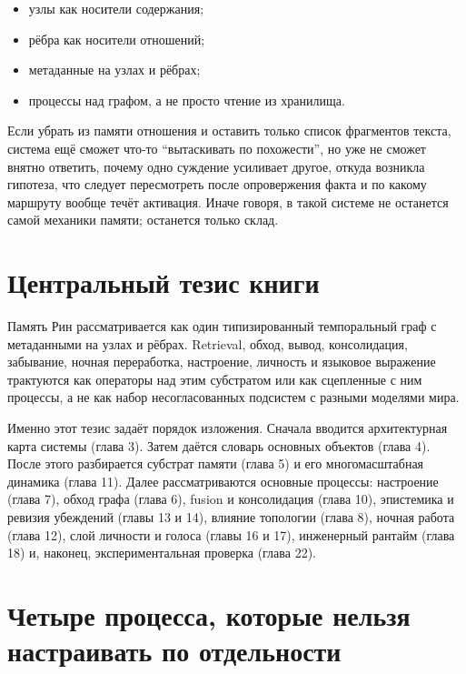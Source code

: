 \begin{itemize}
\item узлы как носители содержания;
\item рёбра как носители отношений;
\item метаданные на узлах и рёбрах;
\item процессы над графом, а не просто чтение из хранилища.
\end{itemize}

\begin{intuition}
Если убрать из памяти отношения и оставить только список фрагментов текста,
система ещё сможет что-то ``вытаскивать по похожести'', но уже не сможет внятно
ответить, почему одно суждение усиливает другое, откуда возникла гипотеза, что
следует пересмотреть после опровержения факта и по какому маршруту вообще
течёт активация. Иначе говоря, в такой системе не останется самой механики
памяти; останется только склад.
\end{intuition}

\section{Центральный тезис книги}

\begin{principle}
Память Рин рассматривается как один типизированный темпоральный граф с
метаданными на узлах и рёбрах. Retrieval, обход, вывод, консолидация,
забывание, ночная переработка, настроение, личность и языковое выражение
трактуются как операторы над этим субстратом или как сцепленные с ним
процессы, а не как набор несогласованных подсистем с разными моделями мира.
\end{principle}

Именно этот тезис задаёт порядок изложения. Сначала вводится архитектурная
карта системы (глава 3). Затем даётся словарь основных объектов (глава 4).
После этого разбирается субстрат памяти (глава 5) и его многомасштабная
динамика (глава 11). Далее рассматриваются основные процессы: настроение
(глава 7), обход графа (глава 6), fusion и консолидация (глава 10), эпистемика
и ревизия убеждений (главы 13 и 14), влияние топологии (глава 8), ночная
работа (глава 12), слой личности и голоса (главы 16 и 17), инженерный рантайм
(глава 18) и, наконец, экспериментальная проверка (глава 22).

\section{Четыре процесса, которые нельзя настраивать по отдельности}

